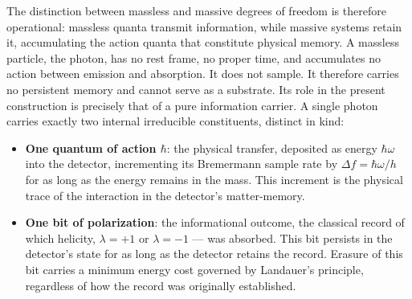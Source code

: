 \documentclass[12pt,a4paper]{article}
\begin{document}


The distinction between massless and massive degrees of freedom is therefore operational: massless quanta transmit information, while massive systems retain it, accumulating the action quanta that constitute physical memory. A massless particle, the photon, has no rest frame, no proper time, and accumulates no action between emission and absorption. It does not sample. It therefore carries no persistent
memory and cannot serve as a substrate. Its role in the present construction is precisely
that of a pure information carrier. A single photon carries exactly two internal irreducible constituents, distinct in kind:

\begin{itemize}

\item \textbf{One quantum of action $\hbar$}: the physical transfer, 
deposited as energy $\hbar\omega$ into the detector, incrementing its 
Bremermann sample rate by $\Delta f = \hbar\omega/h$ for as long as the 
energy remains in the mass. This increment is the physical trace of the 
interaction in the detector's matter-memory.
\item \textbf{One bit of polarization}: the informational outcome, the 
classical record of which helicity, $\lambda = +1$ or $\lambda = -1$ 
--- was absorbed. This bit persists in the detector's state for as long 
as the detector retains the record. Erasure of this bit carries a minimum 
energy cost governed by Landauer's principle, regardless of how the 
record was originally established.
\end{itemize}
\end{document}
